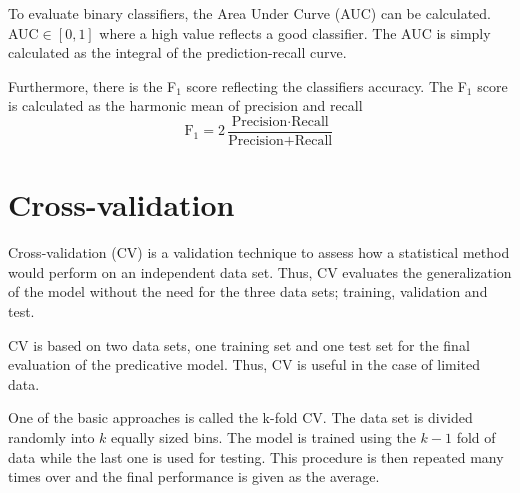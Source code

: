 To evaluate binary classifiers, the Area Under Curve (AUC) can be calculated. AUC$\in[0,1]$ where a high value reflects a good classifier. The AUC is simply calculated as the integral of the prediction-recall curve.

Furthermore, there is the F$_1$ score reflecting the classifiers accuracy. The F$_1$ score is calculated as the harmonic mean of precision and recall \citep{powers2011}
\begin{equation}
    \text{F}_1 = 2\frac{\text{Precision}\cdot \text{Recall}}{\text{Precision}+\text{Recall}}
\end{equation}

\section{Cross-validation}
Cross-validation (CV) is a validation technique to assess how a statistical method would perform on an independent data set. Thus, CV evaluates the generalization of the model without the need for the three data sets; training, validation and test.

CV is based on two data sets, one training set and one test set for the final evaluation of the predicative model. Thus, CV is useful in the case of limited data. 

One of the basic approaches is called the k-fold CV. The data set is divided randomly into $k$ equally sized bins. The model is trained using the $k-1$ fold of data while the last one is used for testing. This procedure is then repeated many times over and the final performance is given as the average.



